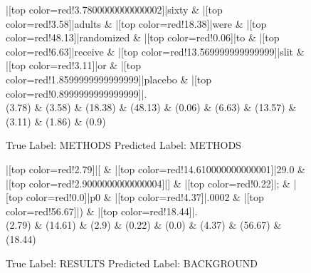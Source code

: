 \documentclass[a4paper, landscape]{article}
\begin{document}
\clearpage
\begin{figure}
\begin{center}
\begin{dependency}
\begin{deptext}
|[top color=red!3.7800000000000002]|sixty \& |[top color=red!3.58]|adults \& |[top color=red!18.38]|were \& |[top color=red!48.13]|randomized \& |[top color=red!0.06]|to \& |[top color=red!6.63]|receive \& |[top color=red!13.569999999999999]|slit \& |[top color=red!3.11]|or \& |[top color=red!1.8599999999999999]|placebo \& |[top color=red!0.8999999999999999]|.\\
(3.78) \& (3.58) \& (18.38) \& (48.13) \& (0.06) \& (6.63) \& (13.57) \& (3.11) \& (1.86) \& (0.9)\\
\end{deptext}
\end{dependency}
\end{center}
\caption{True Label: METHODS Predicted Label: METHODS}
\end{figure}
\clearpage
\begin{figure}
\begin{center}
\begin{dependency}
\begin{deptext}
|[top color=red!2.79]|[ \& |[top color=red!14.610000000000001]|29.0 \& |[top color=red!2.9000000000000004]|] \& |[top color=red!0.22]|; \& |[top color=red!0.0]|p0 \& |[top color=red!4.37]|.0002 \& |[top color=red!56.67]|) \& |[top color=red!18.44]|.\\
(2.79) \& (14.61) \& (2.9) \& (0.22) \& (0.0) \& (4.37) \& (56.67) \& (18.44)\\
\end{deptext}
\end{dependency}
\end{center}
\caption{True Label: RESULTS Predicted Label: BACKGROUND}
\end{figure}
\clearpage
\end{document}
